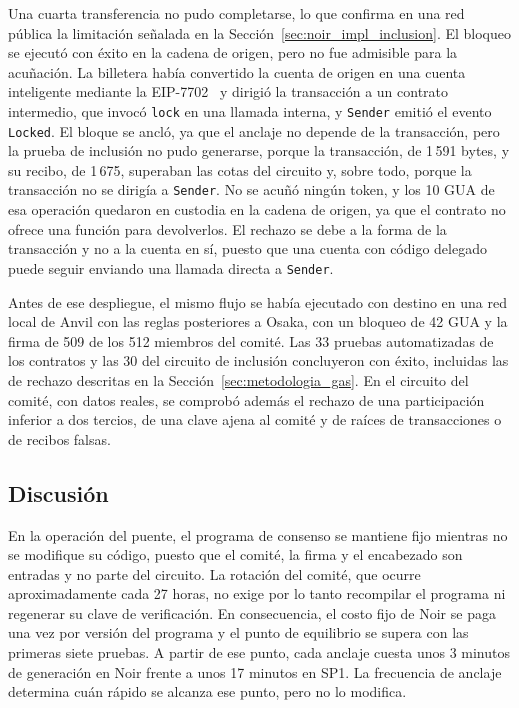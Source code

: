 Una cuarta transferencia no pudo completarse, lo que confirma en una red pública la limitación
señalada en la Sección~\ref{sec:noir_impl_inclusion}. El bloqueo se ejecutó con éxito en la
cadena de origen, pero no fue admisible para la acuñación. La billetera había convertido la cuenta de
origen en una cuenta inteligente mediante la EIP-7702~\cite{eip7702} y dirigió la transacción a un
contrato intermedio, que invocó \lstinline|lock| en una llamada interna, y \texttt{Sender} emitió
el evento \texttt{Locked}. El bloque se ancló, ya que el anclaje no depende
de la transacción, pero la prueba de inclusión no pudo generarse, porque la transacción, de
1\,591 bytes, y su recibo, de 1\,675, superaban las cotas del circuito y, sobre todo, porque la
transacción no se dirigía a \texttt{Sender}. No se acuñó ningún token, y los 10 GUA de esa
operación quedaron en custodia en la cadena de origen, ya que el contrato no ofrece una función
para devolverlos. El rechazo se debe a la forma de la transacción y no a la cuenta en sí, puesto
que una cuenta con código delegado puede seguir enviando una llamada directa a \texttt{Sender}.

Antes de ese despliegue, el mismo flujo se había ejecutado con destino en una red local de Anvil
con las reglas posteriores a Osaka, con un bloqueo de 42 GUA y la firma de 509 de los 512 miembros
del comité. Las 33 pruebas automatizadas de los contratos y las 30 del circuito de inclusión
concluyeron con éxito, incluidas las de rechazo descritas en la Sección~\ref{sec:metodologia_gas}.
En el circuito del comité, con datos reales, se comprobó además el rechazo de una participación
inferior a dos tercios, de una clave ajena al comité y de raíces de transacciones o de recibos
falsas.

\subsection{Discusión}
\label{sec:resultados_discusion}

En la operación del puente, el programa de consenso se mantiene fijo mientras no se modifique su
código, puesto que el comité, la firma y el encabezado son entradas y no parte del circuito. La
rotación del comité, que ocurre aproximadamente cada 27 horas, no exige por lo tanto recompilar el
programa ni regenerar su clave de verificación. En consecuencia, el costo fijo de Noir se paga una
vez por versión del programa y el punto de equilibrio se supera con las primeras siete pruebas. A
partir de ese punto, cada anclaje cuesta unos 3 minutos de generación en Noir frente a unos
17 minutos en SP1. La frecuencia de anclaje determina cuán rápido se alcanza ese punto, pero no lo
modifica.


